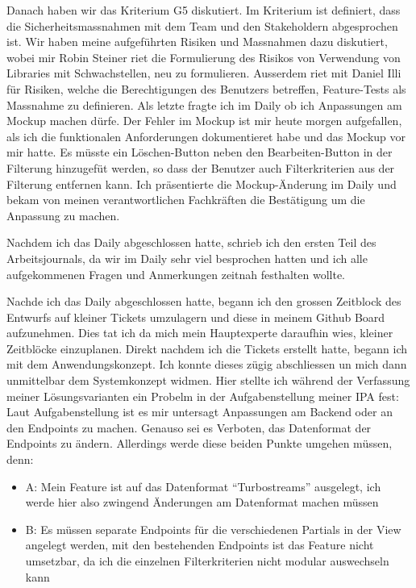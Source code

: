 Danach haben wir das Kriterium G5 diskutiert. Im Kriterium ist definiert, dass die Sicherheitsmassnahmen mit dem Team und den Stakeholdern
abgesprochen ist. Wir haben meine aufgeführten Risiken und Massnahmen dazu diskutiert, wobei mir Robin Steiner riet die Formulierung des Risikos von
Verwendung von Libraries mit Schwachstellen, neu zu formulieren. Ausserdem riet mit Daniel Illi für Risiken, welche die Berechtigungen des Benutzers betreffen,
Feature-Tests als Massnahme zu definieren. Als letzte fragte ich im Daily ob ich Anpassungen am Mockup machen dürfe. Der Fehler im Mockup ist mir heute morgen aufgefallen, 
als ich die funktionalen Anforderungen dokumentieret habe und das Mockup vor mir hatte. Es müsste ein Löschen-Button neben den Bearbeiten-Button in der Filterung hinzugefüt werden,
so dass der Benutzer auch Filterkriterien aus der Filterung entfernen kann. Ich präsentierte die Mockup-Änderung im Daily und bekam von meinen verantwortlichen Fachkräften
die Bestätigung um die Anpassung zu machen. 

Nachdem ich das Daily abgeschlossen hatte, schrieb ich den ersten Teil des Arbeitsjournals, da wir im Daily sehr viel besprochen hatten und ich
alle aufgekommenen Fragen und Anmerkungen zeitnah festhalten wollte.

Nachde ich das Daily abgeschlossen hatte, begann ich den grossen Zeitblock des Entwurfs auf kleiner Tickets umzulagern und diese in meinem Github Board aufzunehmen.
Dies tat ich da mich mein Hauptexperte daraufhin wies, kleiner Zeitblöcke einzuplanen. Direkt nachdem ich die Tickets erstellt hatte, begann ich mit dem Anwendungskonzept.
Ich konnte dieses zügig abschliessen un mich dann unmittelbar dem Systemkonzept widmen. Hier stellte ich während der Verfassung meiner Lösungsvarianten ein Probelm in der Aufgabenstellung
meiner IPA fest: Laut Aufgabenstellung ist es mir untersagt Anpassungen am Backend oder an den Endpoints zu machen. Genauso sei es Verboten, das Datenformat der Endpoints zu ändern. Allerdings
werde diese beiden Punkte umgehen müssen, denn:

\begin{itemize}
    \item A: Mein Feature ist auf das Datenformat ``Turbostreams'' ausgelegt, ich werde hier also zwingend Änderungen am Datenformat machen müssen
    \item B: Es müssen separate Endpoints für die verschiedenen Partials in der View angelegt werden, mit den bestehenden Endpoints ist das Feature nicht umsetzbar, da ich die einzelnen Filterkriterien nicht modular auswechseln kann
\end{itemize}

